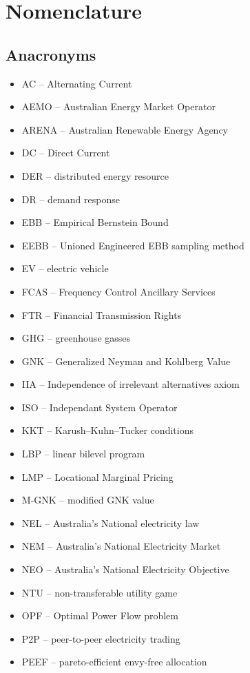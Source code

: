 \chapter*{Nomenclature}

\section*{Anacronyms}
\begin{itemize}
\item	AC -- Alternating Current
\item	AEMO -- Australian Energy Market Operator
\item	ARENA -- Australian Renewable Energy Agency
\item	DC -- Direct Current
\item	DER -- distributed energy resource
\item	DR -- demand response
\item	EBB -- Empirical Bernstein Bound
\item	EEBB -- Unioned Engineered EBB sampling method
\item	EV -- electric vehicle
\item	FCAS -- Frequency Control Ancillary Services
\item	FTR -- Financial Transmission Rights
\item	GHG -- greenhouse gasses
\item	GNK -- Generalized Neyman and Kohlberg Value
\item	IIA -- Independence of irrelevant alternatives axiom
\item	ISO -- Independant System Operator
\item	KKT -- Karush–Kuhn–Tucker conditions
\item	LBP -- linear bilevel program
\item	LMP -- Locational Marginal Pricing
\item	M-GNK -- modified GNK value
\item	NEL -- Australia's National electricity law
\item	NEM -- Australia's National Electricity Market
\item	NEO -- Australia's National Electricity Objective
\item	NTU -- non-transferable utility game
\item	OPF -- Optimal Power Flow problem
\item	P2P -- peer-to-peer electricity trading
\item	PEEF -- pareto-efficient envy-free allocation

\end{itemize}
